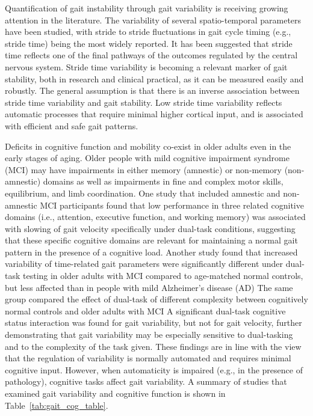 \documentclass[11pt, oneside]{report}
\begin{document}
Quantification of gait instability through gait variability is receiving growing attention in the literature. The variability of several spatio-temporal parameters have been studied, with stride to stride fluctuations in gait cycle timing (e.g., stride time) being the most widely reported\cite{Montero-Odasso2013}. It has been suggested that stride time reflects one of the final pathways of the outcomes regulated by the central nervous system\cite{Montero-Odasso2013}. Stride time variability is becoming a relevant marker of gait stability, both in research and clinical practical, as it can be measured easily and robustly\cite{Hausdorff2005}. The general assumption is that there is an inverse association between stride time variability and gait stability\cite{Montero-Odasso2013}. Low stride time variability reflects automatic processes that require minimal higher cortical input, and is associated with efficient and safe gait patterns\cite{Hausdorff2005}.

Deficits in cognitive function and mobility co-exist in older adults even in the early stages of aging\cite{Montero-Odasso2013}. Older people with mild cognitive impairment syndrome (MCI) may have impairments in either memory (amnestic) or non-memory (non-amnestic) domains\cite{Yamada2011} as well as impairments in fine and complex motor skills, equilibrium, and limb coordination\cite{Montero-Odasso2013}. One study that included amnestic and non-amnestic MCI participants found that low performance in three related cognitive domains (i.e., attention, executive function, and working memory) was associated with slowing of gait velocity specifically under dual-task conditions, suggesting that these specific cognitive domains are relevant for maintaining a normal gait pattern in the presence of a cognitive load\cite{Montero-Odasso2009}. Another study found that increased variability of time-related gait parameters were significantly different under dual-task testing in older adults with MCI compared to age-matched normal controls, but less affected than in people with mild Alzheimer's disease (AD) \cite{Muir2012a} The same group compared the effect of dual-task of different complexity between cognitively normal controls and older adults with MCI\cite{Montero-Odasso2012} A significant dual-task cognitive status interaction was found for gait variability, but not for gait velocity, further demonstrating that gait variability may be especially sensitive to dual-tasking and to the complexity of the task given\cite{Montero-Odasso2013}. These findings are in line with the view that the regulation of variability is normally automated and requires minimal cognitive input. However, when automaticity is impaired (e.g., in the presence of pathology), cognitive tasks affect gait variability. A summary of studies that examined gait variability and cognitive function is shown in Table~\ref{tab:gait_cog_table}.
\end{document}
